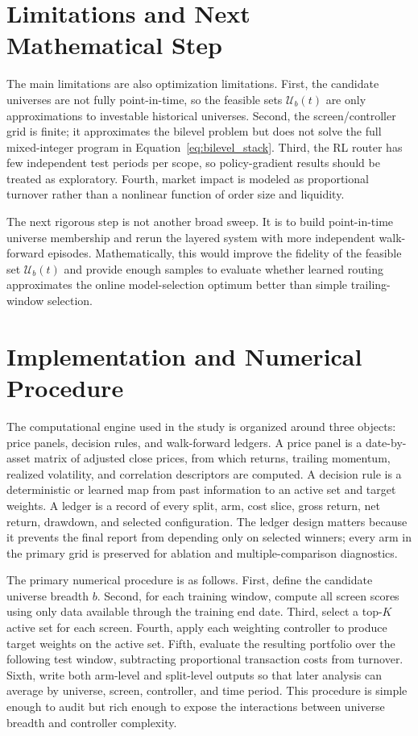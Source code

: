 \documentclass[journal,10pt]{IEEEtran}
\begin{document}
\section{Limitations and Next Mathematical Step}
The main limitations are also optimization limitations. First, the candidate universes are not fully point-in-time, so the feasible sets $\mathcal{U}_b(t)$ are only approximations to investable historical universes. Second, the screen/controller grid is finite; it approximates the bilevel problem but does not solve the full mixed-integer program in Equation~\eqref{eq:bilevel_stack}. Third, the RL router has few independent test periods per scope, so policy-gradient results should be treated as exploratory. Fourth, market impact is modeled as proportional turnover rather than a nonlinear function of order size and liquidity.

The next rigorous step is not another broad sweep. It is to build point-in-time universe membership and rerun the layered system with more independent walk-forward episodes. Mathematically, this would improve the fidelity of the feasible set $\mathcal{U}_b(t)$ and provide enough samples to evaluate whether learned routing approximates the online model-selection optimum better than simple trailing-window selection.


\section{Implementation and Numerical Procedure}
The computational engine used in the study is organized around three objects: price panels, decision rules, and walk-forward ledgers. A price panel is a date-by-asset matrix of adjusted close prices, from which returns, trailing momentum, realized volatility, and correlation descriptors are computed. A decision rule is a deterministic or learned map from past information to an active set and target weights. A ledger is a record of every split, arm, cost slice, gross return, net return, drawdown, and selected configuration. The ledger design matters because it prevents the final report from depending only on selected winners; every arm in the primary grid is preserved for ablation and multiple-comparison diagnostics.

The primary numerical procedure is as follows. First, define the candidate universe breadth $b$. Second, for each training window, compute all screen scores using only data available through the training end date. Third, select a top-$K$ active set for each screen. Fourth, apply each weighting controller to produce target weights on the active set. Fifth, evaluate the resulting portfolio over the following test window, subtracting proportional transaction costs from turnover. Sixth, write both arm-level and split-level outputs so that later analysis can average by universe, screen, controller, and time period. This procedure is simple enough to audit but rich enough to expose the interactions between universe breadth and controller complexity.
\end{document}
